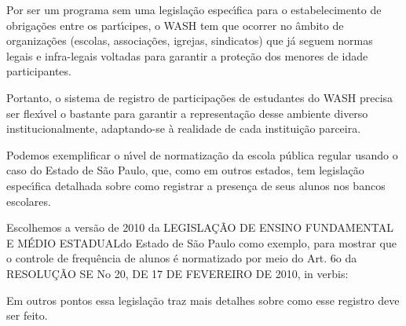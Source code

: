 \documentclass[
12pt,		%
openright,	%
twoside,  %
a4paper,			%
chapter=TITLE,		%
english,			%
french,				%
spanish,			%
brazil				%
]{USPSC-classe/USPSC_RedarTex}
\begin{document}
Por ser um programa sem uma legisla\c{c}\~ao espec\'{\i}fica para o estabelecimento de obriga\c{c}\~oes entre os part\'{\i}cipes, o WASH tem que ocorrer no \^ambito de organiza\c{c}\~oes (escolas, associa\c{c}\~oes, igrejas, sindicatos) que j\'a seguem normas legais e infra-legais voltadas para garantir a prote\c{c}\~ao dos menores de idade participantes.








Portanto, o sistema de registro de participa\c{c}\~oes de estudantes do WASH precisa ser flex\'{\i}vel o bastante para garantir a representa\c{c}\~ao desse ambiente diverso institucionalmente, adaptando-se \`a realidade de cada institui\c{c}\~ao parceira.








Podemos exemplificar o n\'{\i}vel de normatiza\c{c}\~ao da escola p\'ublica regular usando o caso do Estado de S\~ao Paulo, que, como em outros estados, tem legisla\c{c}\~ao espec\'{\i}fica detalhada sobre como registrar a presen\c{c}a de seus alunos nos bancos escolares.








Escolhemos a vers\~ao de 2010 da \textquotedbl LEGISLA\c{C}\~AO DE ENSINO FUNDAMENTAL E M\'EDIO ESTADUAL\textquotedbl  do Estado de S\~ao Paulo como exemplo, para mostrar que o controle de frequ\^encia de alunos \'e normatizado por meio do Art. 6o da RESOLU\c{C}\~AO SE No 20, DE 17 DE FEVEREIRO DE 2010, in verbis:









\noindent\begin{center}\mbox{\centering{}}\end{center}


Em outros pontos essa legisla\c{c}\~ao traz mais detalhes sobre como esse registro deve ser feito.
\end{document}
